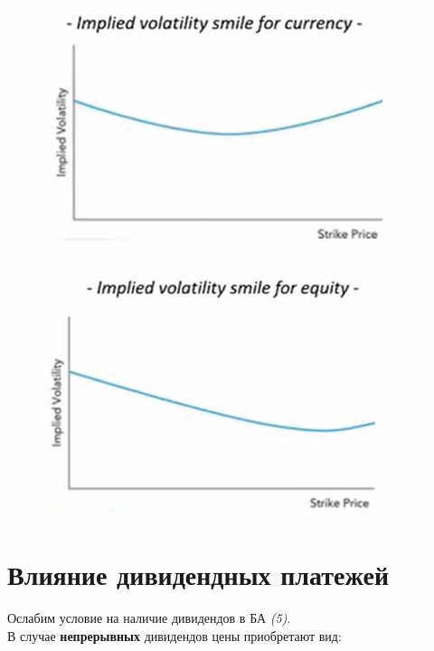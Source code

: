 \documentclass{article}
\begin{document}
\begin{figure}[!h]
\centering
\begin{minipage}{.5\textwidth}
  \centering
  \includegraphics[width=.8\linewidth]{impl vol curr.PNG}
  \label{fig:test1}
\end{minipage}%
\begin{minipage}{.5\textwidth}
  \centering
  \includegraphics[width=.8\linewidth]{impl vol equity.PNG}
  \label{fig:test2}
\end{minipage}
\end{figure}


\section{Влияние дивидендных платежей}
Ослабим условие на наличие дивидендов в БА \textit{(5)}.\\
В случае \textbf{непрерывных} дивидендов цены приобретают вид:
\end{document}
